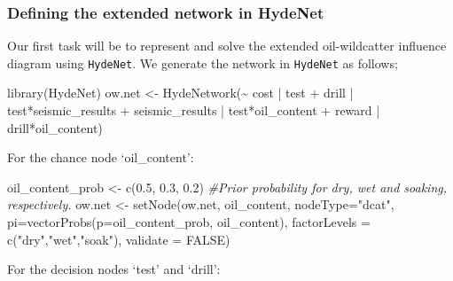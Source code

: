 \documentclass[
]{article}
\newenvironment{Shaded}{\begin{snugshade}}{\end{snugshade}}
\newcommand{\AttributeTok}[1]{\textcolor[rgb]{0.77,0.63,0.00}{#1}}
\newcommand{\CommentTok}[1]{\textcolor[rgb]{0.56,0.35,0.01}{\textit{#1}}}
\newcommand{\ConstantTok}[1]{\textcolor[rgb]{0.00,0.00,0.00}{#1}}
\newcommand{\FloatTok}[1]{\textcolor[rgb]{0.00,0.00,0.81}{#1}}
\newcommand{\FunctionTok}[1]{\textcolor[rgb]{0.00,0.00,0.00}{#1}}
\newcommand{\NormalTok}[1]{#1}
\newcommand{\OtherTok}[1]{\textcolor[rgb]{0.56,0.35,0.01}{#1}}
\newcommand{\SpecialCharTok}[1]{\textcolor[rgb]{0.00,0.00,0.00}{#1}}
\newcommand{\StringTok}[1]{\textcolor[rgb]{0.31,0.60,0.02}{#1}}
\begin{document}
\hypertarget{defining-the-extended-network-in-hydenet}{%
\subsubsection{Defining the extended network in HydeNet}\label{defining-the-extended-network-in-hydenet}}

Our first task will be to represent and solve the extended oil-wildcatter influence diagram using \texttt{HydeNet}. We generate the network in \texttt{HydeNet} as follows;

\begin{Shaded}
\begin{Highlighting}[]
\FunctionTok{library}\NormalTok{(HydeNet)}
\NormalTok{ow.net }\OtherTok{\textless{}{-}} \FunctionTok{HydeNetwork}\NormalTok{(}\SpecialCharTok{\textasciitilde{}}\NormalTok{ cost }\SpecialCharTok{|}\NormalTok{ test }
                      \SpecialCharTok{+}\NormalTok{ drill }\SpecialCharTok{|}\NormalTok{ test}\SpecialCharTok{*}\NormalTok{seismic\_results }
                      \SpecialCharTok{+}\NormalTok{ seismic\_results }\SpecialCharTok{|}\NormalTok{ test}\SpecialCharTok{*}\NormalTok{oil\_content }
                      \SpecialCharTok{+}\NormalTok{ reward }\SpecialCharTok{|}\NormalTok{ drill}\SpecialCharTok{*}\NormalTok{oil\_content)}
\end{Highlighting}
\end{Shaded}

For the chance node `oil\_content':

\begin{Shaded}
\begin{Highlighting}[]
\NormalTok{oil\_content\_prob }\OtherTok{\textless{}{-}} \FunctionTok{c}\NormalTok{(}\FloatTok{0.5}\NormalTok{, }\FloatTok{0.3}\NormalTok{, }\FloatTok{0.2}\NormalTok{) }\CommentTok{\#Prior probability for dry, wet and soaking, respectively.}
\NormalTok{ow.net }\OtherTok{\textless{}{-}} \FunctionTok{setNode}\NormalTok{(ow.net, oil\_content, }\AttributeTok{nodeType=}\StringTok{"dcat"}\NormalTok{, }\AttributeTok{pi=}\FunctionTok{vectorProbs}\NormalTok{(}\AttributeTok{p=}\NormalTok{oil\_content\_prob, oil\_content), }\AttributeTok{factorLevels =} \FunctionTok{c}\NormalTok{(}\StringTok{"dry"}\NormalTok{,}\StringTok{"wet"}\NormalTok{,}\StringTok{"soak"}\NormalTok{), }\AttributeTok{validate =} \ConstantTok{FALSE}\NormalTok{)}
\end{Highlighting}
\end{Shaded}

For the decision nodes `test' and `drill':
\end{document}
